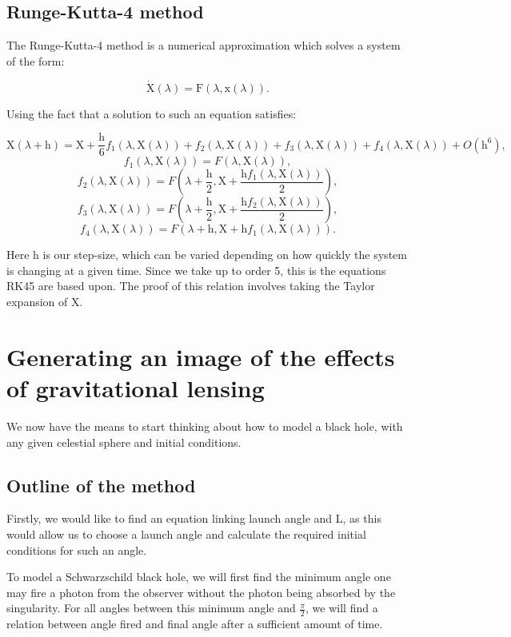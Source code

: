 \documentclass[oneside,openright,frontopenright, singlespacing]{dmathesis}
\begin{document}
\subsection{Runge-Kutta-4 method}\label{subsec:Subsection3.4.1}

	The Runge-Kutta-4 method is a numerical approximation which solves a system of the form:

	\[\dot{\mbox{X}}(\lambda) = \mbox{F}(\lambda,\mbox{x}(\lambda)).\]

	Using the fact that a solution to such an equation satisfies:

	\[\mbox{X}(\lambda+\mbox{h}) = \mbox{X} + \frac{\mbox{h}}{6}f_1(\lambda,\mbox{X}(\lambda))+f_2(\lambda,\mbox{X}(\lambda))+f_3(\lambda,\mbox{X}(\lambda))+f_4(\lambda,\mbox{X}(\lambda))+O(\mbox{h}^6),\]
	\[f_1(\lambda,\mbox{X}(\lambda)) = F(\lambda,\mbox{X}(\lambda)),\]
	\[f_2(\lambda,\mbox{X}(\lambda)) = F\left(\lambda+\frac{\mbox{h}}{2},\mbox{X}+\frac{\mbox{h}f_1(\lambda,\mbox{X}(\lambda))}{2}\right),\]
	\[f_3(\lambda,\mbox{X}(\lambda)) = F\left(\lambda+\frac{\mbox{h}}{2},\mbox{X}+\frac{\mbox{h}f_2(\lambda,\mbox{X}(\lambda))}{2}\right),\]
	\[f_4(\lambda,\mbox{X}(\lambda)) = F\left(\lambda+\mbox{h},\mbox{X}+\mbox{h}f_1(\lambda,\mbox{X}(\lambda))\right).\]

	Here h is our step-size, which can be varied depending on how quickly the system is changing at a given time. Since we take up to order 5, this is the equations RK45 are based upon. The proof of this relation involves taking the Taylor expansion of X.

\section{Generating an image of the effects of gravitational lensing}\label{sec:Section3.5}

	We now have the means to start thinking about how to model a black hole, with any given celestial sphere and initial conditions.

\subsection{Outline of the method}\label{subsec:Subsection3.5.1}

	Firstly, we would like to find an equation linking launch angle and L, as this would allow us to choose a launch angle and calculate the required initial conditions for such an angle.

\vspace{1em}
	To model a Schwarzschild black hole, we will first find the minimum angle one may fire a photon from the observer without the photon being absorbed by the singularity. For all angles between this minimum angle and $\frac{\pi}{2}$, we will find a relation between angle fired and final angle after a sufficient amount of time.
\end{document}
